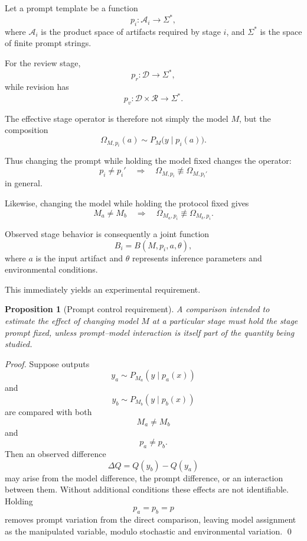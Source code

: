 \documentclass[11pt]{article}
\newtheorem{proposition}[definition]{Proposition}
\begin{document}
Let a prompt template be a function
\[
    p_i:\mathcal{A}_i\rightarrow\Sigma^\ast,
\]
where \(\mathcal{A}_i\) is the product space of artifacts required by stage \(i\), and \(\Sigma^\ast\) is the space of finite prompt strings.

For the review stage,
\[
    p_r:\mathcal{D}\rightarrow\Sigma^\ast,
\]
while revision has
\[
    p_v:\mathcal{D}\times\mathcal{R}
    \rightarrow\Sigma^\ast.
\]

The effective stage operator is therefore not simply the model \(M\), but the composition
\[
    \Omega_{M,p_i}(a)
    \sim
    P_M\bigl(
        y\mid p_i(a)
    \bigr).
\]

Thus changing the prompt while holding the model fixed changes the operator:
\[
    p_i\neq p_i'
    \quad\Longrightarrow\quad
    \Omega_{M,p_i}
    \not\equiv
    \Omega_{M,p_i'}
\]
in general.

Likewise, changing the model while holding the protocol fixed gives
\[
    M_a\neq M_b
    \quad\Longrightarrow\quad
    \Omega_{M_a,p_i}
    \not\equiv
    \Omega_{M_b,p_i}.
\]

Observed stage behavior is consequently a joint function
\[
    B_i
    =
    B(M,p_i,a,\theta),
\]
where \(a\) is the input artifact and \(\theta\) represents inference parameters and environmental conditions.

This immediately yields an experimental requirement.

\begin{proposition}[Prompt control requirement]
A comparison intended to estimate the effect of changing model \(M\) at a particular stage must hold the stage prompt fixed, unless prompt--model interaction is itself part of the quantity being studied.
\end{proposition}

\begin{proof}
Suppose outputs
\[
    y_a\sim P_{M_a}(y\mid p_a(x))
\]
and
\[
    y_b\sim P_{M_b}(y\mid p_b(x))
\]
are compared with both
\[
    M_a\neq M_b
\]
and
\[
    p_a\neq p_b.
\]
Then an observed difference
\[
    \Delta Q=Q(y_b)-Q(y_a)
\]
may arise from the model difference, the prompt difference, or an interaction between them. Without additional conditions these effects are not identifiable. Holding
\[
    p_a=p_b=p
\]
removes prompt variation from the direct comparison, leaving model assignment as the manipulated variable, modulo stochastic and environmental variation. \qed
\end{proof}
\end{document}
